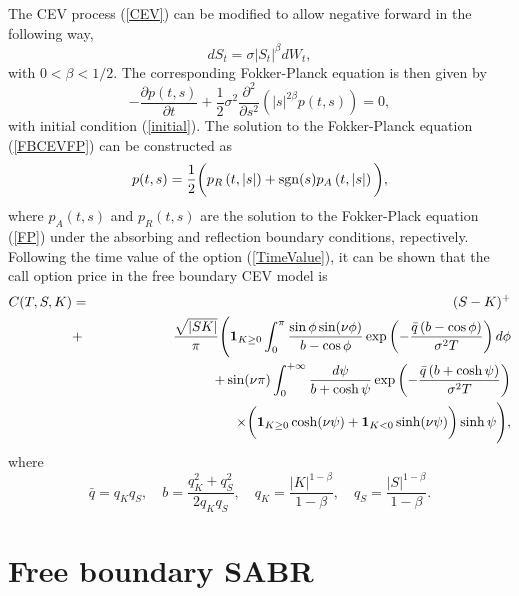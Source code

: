\documentclass[12pt]{article}
\begin{document}
  The CEV process (\ref{CEV}) can be modified to allow negative forward in the following way,
  \begin{equation}
    dS_t=\sigma \left|S_t\right|^{\beta}dW_t,
    \label{FreeBoundaryCEV}
  \end{equation}
  with $0<\beta<1/2$. The corresponding Fokker-Planck equation is then given by
  \begin{equation}
    -\frac{\partial p(t,s)}{\partial t}+\frac{1}{2}\sigma^2\frac{\partial^2}{\partial s^2}
    \left(\left|s\right|^{2\beta}p(t,s)\right) = 0,
    \label{FBCEVFP}
  \end{equation}
  with initial condition (\ref{initial}). The solution to the Fokker-Planck equation (\ref{FBCEVFP})
  can be constructed as
  \begin{equation}
    p(t,s)=\frac{1}{2}\bigg(p_R\left(t,\left|s\right|\right)+{\rm sgn}(s)p_A\left(t,\left|s\right|\right)\bigg),
  \end{equation}
  where $p_A(t,s)$ and $p_R(t,s)$ are the solution to the Fokker-Plack equation (\ref{FP}) under
  the absorbing and reflection boundary conditions, repectively. Following the time value of the option (\ref{TimeValue}),
  it can be shown that the call option price in the free boundary CEV model is
  \begin{eqnarray}
    C(T,S,K) &=& (S-K)^+ \nonumber\\
             &+&\frac{\sqrt{\left|SK\right|}}{\pi}\Bigg({\bf 1}_{K\geq 0}\int_0^{\pi}\frac{\sin\phi\sin(\nu\phi)}{b-\cos\phi}
                        \exp\left(-\frac{\bar{q}\left(b-\cos\phi\right)}{\sigma^2T}\right)d\phi\nonumber\\
             &&\quad\quad\quad\quad\quad + \sin(\nu\pi)\int_0^{+\infty}
                \frac{d\psi}{b+\cosh \psi}
       \exp\left(-\frac{\bar{q}\left(b+\cosh \psi\right)}{\sigma^2T}\right)\nonumber\\
             &&\quad\quad\quad\quad\quad\quad\quad\quad\quad\quad \times
                  \bigg({\bf 1}_{K\geq 0}\cosh(\nu \psi)+{\bf 1}_{K< 0}\sinh(\nu \psi)\bigg)\sinh \psi\Bigg),
  \end{eqnarray}
  where
  \begin{equation}
    \bar{q}=q_Kq_S,\quad b=\frac{q_K^2+q_S^2}{2q_Kq_S},\quad q_K=\frac{|K|^{1-\beta}}{1-\beta},
    \quad q_S=\frac{|S|^{1-\beta}}{1-\beta}.
  \end{equation}



\section{Free boundary SABR}
\end{document}
